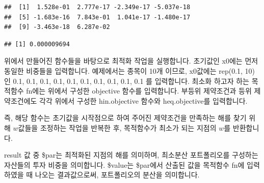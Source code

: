 \documentclass[12pt,]{book}
\newenvironment{Shaded}{\begin{snugshade}}{\end{snugshade}}
\newcommand{\DataTypeTok}[1]{\textcolor[rgb]{0.13,0.29,0.53}{#1}}
\newcommand{\DecValTok}[1]{\textcolor[rgb]{0.00,0.00,0.81}{#1}}
\newcommand{\FloatTok}[1]{\textcolor[rgb]{0.00,0.00,0.81}{#1}}
\newcommand{\KeywordTok}[1]{\textcolor[rgb]{0.13,0.29,0.53}{\textbf{#1}}}
\newcommand{\NormalTok}[1]{#1}
\newcommand{\OperatorTok}[1]{\textcolor[rgb]{0.81,0.36,0.00}{\textbf{#1}}}
\newcommand{\StringTok}[1]{\textcolor[rgb]{0.31,0.60,0.02}{#1}}
\begin{document}
\begin{Shaded}
\end{Shaded}

\begin{verbatim}
##  [1]  1.528e-01  2.777e-17 -2.349e-17 -5.037e-18
##  [5] -1.683e-16  7.843e-01  1.041e-17 -1.480e-17
##  [9] -3.463e-18  6.287e-02
\end{verbatim}

\begin{Shaded}
\end{Shaded}

\begin{verbatim}
## [1] 0.000009694
\end{verbatim}

위에서 만들어진 함수들을 바탕으로 최적화 작업을 실행합니다. 초기값인 x0에는 먼저 동일한 비중들을 입력합니다. 예제에서는 종목이 10개 이므로, x0값에는 rep(0.1, 10) 인 0.1, 0.1, 0.1, 0.1, 0.1, 0.1, 0.1, 0.1, 0.1, 0.1 를 입력합니다. 최소화 하고자 하는 목적함수 fn에는 위에서 구성한 objective 함수를 입력합니다. 부등위 제약조건과 등위 제약조건에도 각각 위에서 구성한 hin.objective 함수와 heq.objective를 입력합니다.

즉, 해당 함수는 초기값을 시작점으로 하여 주어진 제약조건을 만족하는 해를 찾기 위해 \(w\)값들을 조정하는 작업을 반복한 후, 목적함수가 최소가 되는 지점의 \(w\)를 반환합니다.

result 값 중 \$par는 최적화된 지점의 해를 의미하며, 최소분산 포트폴리오를 구성하는 자산들의 투자 비중을 의미합니다. \$value는 \$par에서 산출된 값을 목적함수 fn에 입력하였을 때 나오는 결과값으로써, 포트폴리오의 분산을 의미합니다.

\begin{Shaded}
\end{Shaded}
\end{document}
